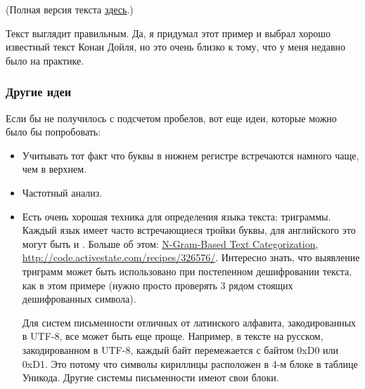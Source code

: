 (Полная версия текста \href{https://github.com/DennisYurichev/RE-for-beginners/blob/master/ff/XOR/mask_2/files/plain.txt}{здесь}.)

Текст выглядит правильным.
Да, я придумал этот пример и выбрал хорошо известный текст Конан Дойля, но это очень близко к тому,
что у меня недавно было на практике.

\subsubsection{Другие идеи}

Если бы не получилось с подсчетом пробелов, вот еще идеи, которые можно было бы попробовать:

\begin{itemize}

\item Учитывать тот факт что буквы в нижнем регистре встречаются намного чаще, чем в верхнем.

\item Частотный анализ.

\item Есть очень хорошая техника для определения языка текста: триграммы.
Каждый язык имеет часто встречающиеся тройки буквы, для английского это могут быть  и .
Больше об этом:
\href{http://odur.let.rug.nl/~vannoord/TextCat/textcat.pdf}{N-Gram-Based Text Categorization},
\url{http://code.activestate.com/recipes/326576/}.
Интересно знать, что выявление триграмм может быть использовано при постепенном дешифровании текста, как в этом примере
(нужно просто проверять 3 рядом стоящих дешифрованных символа).

Для систем письменности отличных от латинского алфавита, закодированных в UTF-8, все может быть еще проще.
Например, в тексте на русском, закодированном в UTF-8, каждый байт перемежается с байтом 0xD0 или 0xD1.
Это потому что символы кириллицы расположен в 4-м блоке в таблице Уникода.
Другие системы письменности имеют свои блоки.

\end{itemize}

